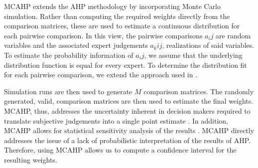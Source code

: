 \documentclass[a4paper]{article}
\begin{document}
MCAHP extends the AHP methodology by incorporating Monte Carlo simulation.
Rather than computing the required weights directly from the comparison matrices, these are used to estimate a continuous distribution for each pairwise comparison.
In this view, the pairwise comparisons $a_ij$ are random variables and the associated expert judgements $a_kij$, realizations of said variables.
To estimate the probability information of $a_ij$, we assume that the underlying distribution function is equal for every expert. 
To determine the distribution fit for each pairwise comparison, we extend the approach used in  \citep{Ataei:2013}.   
 
Simulation runs are then used to generate $M$ comparison matrices.
The randomly generated, valid, comparison matrices are then used to estimate the final weights.
MCAHP, thus, addresses the uncertainty inherent in decision makers required to translate 
subjective judgements into a single point estimate \citep{Ataei:2013}.
In addition, MCAHP allows for statistical sensitivity analysis of the results \citep{Banuelas:2004, Vaidya:2006}. 
MCAHP directly addresses the issue of a lack of probabilistic interpretation of the results of AHP. 
Therefore, using MCAHP allows us to compute a confidence interval for the resulting weights. 

%
\end{document}
